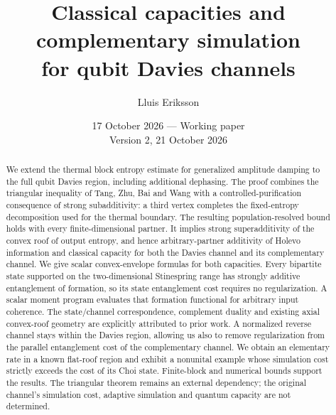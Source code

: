 \documentclass[11pt]{article}
\title{Classical capacities and complementary simulation\\for qubit Davies channels}
\author{Lluis Eriksson}
\date{17 October 2026 --- Working paper\\ Version 2, 21 October 2026}
\begin{document}
\maketitle
\begin{abstract}
We extend the thermal block entropy estimate for generalized amplitude damping to the full qubit Davies region, including additional dephasing. The proof combines the triangular inequality of Tang, Zhu, Bai and Wang with a controlled-purification consequence of strong subadditivity: a third vertex completes the fixed-entropy decomposition used for the thermal boundary. The resulting population-resolved bound holds with every finite-dimensional partner. It implies strong superadditivity of the convex roof of output entropy, and hence arbitrary-partner additivity of Holevo information and classical capacity for both the Davies channel and its complementary channel. We give scalar convex-envelope formulas for both capacities. Every bipartite state supported on the two-dimensional Stinespring range has strongly additive entanglement of formation, so its state entanglement cost requires no regularization. A scalar moment program evaluates that formation functional for arbitrary input coherence. The state/channel correspondence, complement duality and existing axial convex-roof geometry are explicitly attributed to prior work. A normalized reverse channel stays within the Davies region, allowing us also to remove regularization from the parallel entanglement cost of the complementary channel. We obtain an elementary rate in a known flat-roof region and exhibit a nonunital example whose simulation cost strictly exceeds the cost of its Choi state. Finite-block and numerical bounds support the results. The triangular theorem remains an external dependency; the original channel's simulation cost, adaptive simulation and quantum capacity are not determined.
\end{abstract}
\end{document}
